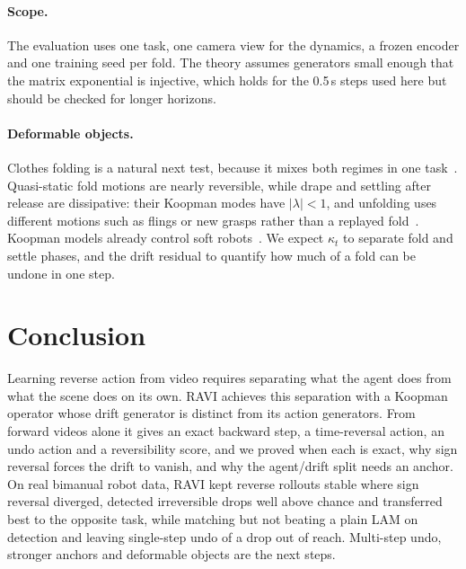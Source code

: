 \documentclass{jcse}
\newcommand{\method}{RAVI}
\begin{document}
\paragraph{Scope.}
The evaluation uses one task, one camera view for the dynamics, a frozen encoder and one training seed per fold.
The theory assumes generators small enough that the matrix exponential is injective, which holds for the 0.5\,s steps used here but should be checked for longer horizons.

\paragraph{Deformable objects.}
Clothes folding is a natural next test, because it mixes both regimes in one task~\cite{lin2020softgym,lin2021vcd}.
Quasi-static fold motions are nearly reversible, while drape and settling after release are dissipative: their Koopman modes have $|\lambda|<1$, and unfolding uses different motions such as flings or new grasps rather than a replayed fold~\cite{ha2021flingbot,avigal2022speedfolding}.
Koopman models already control soft robots~\cite{bruder2019soft}.
We expect $\kappa_t$ to separate fold and settle phases, and the drift residual to quantify how much of a fold can be undone in one step.

\section{Conclusion} \label{s:conclusion}

Learning reverse action from video requires separating what the agent does from what the scene does on its own.
{\method} achieves this separation with a Koopman operator whose drift generator is distinct from its action generators.
From forward videos alone it gives an exact backward step, a time-reversal action, an undo action and a reversibility score, and we proved when each is exact, why sign reversal forces the drift to vanish, and why the agent/drift split needs an anchor.
On real bimanual robot data, {\method} kept reverse rollouts stable where sign reversal diverged, detected irreversible drops well above chance and transferred best to the opposite task, while matching but not beating a plain LAM on detection and leaving single-step undo of a drop out of reach.
Multi-step undo, stronger anchors and deformable objects are the next steps.





\clearpage

\end{document}
